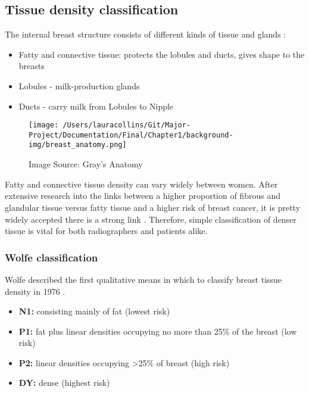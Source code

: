 \subsection{Tissue density classification}

The internal breast structure consists of different kinds of tissue and glands \cite{Anatomy_breast}:

\begin{itemize}
  \item Fatty and connective tissue: protects the lobules and ducts, gives shape to the breasts
  \item Lobules - milk-production glands
  \item Ducts - carry milk from Lobules to Nipple
\end{itemize}

\begin{figure}[!h]
  \center
  \texttt{[image: /Users/lauracollins/Git/Major-Project/Documentation/Final/Chapter1/background-img/breast\_anatomy.png]}
  \caption{Image Source: Gray's Anatomy \cite{Gray_1907}}
  \label{fig:breast-anatomy}
\end{figure}

Fatty and connective tissue density can vary widely between women. After extensive research into the links between a higher proportion of fibrous and glandular tissue versus fatty tissue and a higher risk of breast cancer, it is pretty widely accepted there is a strong link \cite{Boyd_Byng_Jong_Fishell_Little_Miller_Lockwood_Tritchler_Yaffe_1995} . Therefore, simple classification of denser tissue is vital for both radiographers and patients alike.

\subsubsection{Wolfe classification}

Wolfe described the first qualitative means in which to classify breast tissue density in 1976 \cite{Wolfe_1976}.

\begin{itemize}
    \item \textbf{N1:} consisting mainly of fat (lowest risk)
    \item \textbf{P1:} fat plus linear densities occupying no more than 25\% of the breast (low risk)
    \item \textbf{P2:} linear densities occupying \textgreater 25\% of breast (high risk)
    \item \textbf{DY:} dense (highest risk)
\end{itemize}

